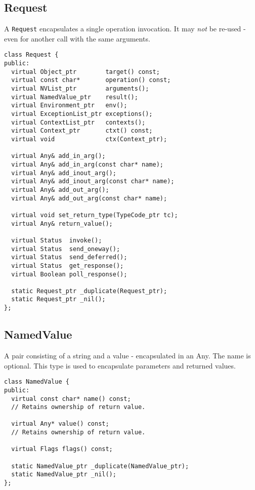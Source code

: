 \documentclass[11pt,twoside,onecolumn]{book}
\begin{document}
\subsection{Request}

A {\tt Request} encapsulates a single operation invocation. It may \emph{not}
be re-used - even for another call with the same arguments.

{\small \begin{verbatim}
class Request {
public:
  virtual Object_ptr        target() const;
  virtual const char*       operation() const;
  virtual NVList_ptr        arguments();
  virtual NamedValue_ptr    result();
  virtual Environment_ptr   env();
  virtual ExceptionList_ptr exceptions();
  virtual ContextList_ptr   contexts();
  virtual Context_ptr       ctxt() const;
  virtual void              ctx(Context_ptr);

  virtual Any& add_in_arg();
  virtual Any& add_in_arg(const char* name);
  virtual Any& add_inout_arg();
  virtual Any& add_inout_arg(const char* name);
  virtual Any& add_out_arg();
  virtual Any& add_out_arg(const char* name);

  virtual void set_return_type(TypeCode_ptr tc);
  virtual Any& return_value();

  virtual Status  invoke();
  virtual Status  send_oneway();
  virtual Status  send_deferred();
  virtual Status  get_response();
  virtual Boolean poll_response();

  static Request_ptr _duplicate(Request_ptr);
  static Request_ptr _nil();
};
\end{verbatim}}


\subsection{NamedValue}

A pair consisting of a string and a value - encapsulated in an Any. The
name is optional. This type is used to encapsulate parameters and returned
values.

{\small \begin{verbatim}
class NamedValue {
public:
  virtual const char* name() const;
  // Retains ownership of return value.

  virtual Any* value() const;
  // Retains ownership of return value.

  virtual Flags flags() const;

  static NamedValue_ptr _duplicate(NamedValue_ptr);
  static NamedValue_ptr _nil();
};
\end{verbatim}}
\end{document}
